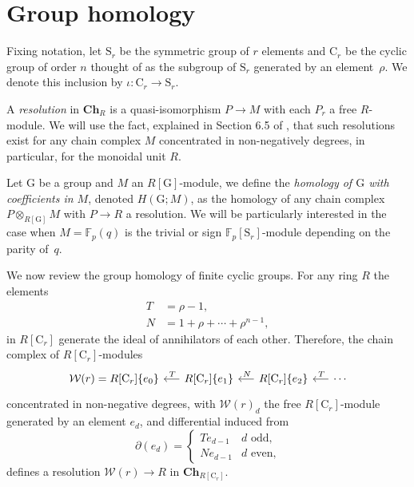 
\section{Group homology} \label{s:goup homology}

Fixing notation, let $\mathrm{S}_r$ be the symmetric group of $r$ elements and $\mathrm{C}_r$ be the cyclic group of order $n$ thought of as the subgroup of $\mathrm{S}_r$ generated by an element~$\rho$.
We denote this inclusion by $\iota \colon \mathrm C_r \to \mathrm S_r$.

A \textit{resolution} in $\mathbf{Ch}_R$ is a quasi-isomorphism $P \to M$ with each $P_r$ a free \mbox{$R$-module}.
We will use the fact, explained in Section 6.5 of \cite{jacobson1989algebra}, that such resolutions exist for any chain complex $M$ concentrated in non-negatively degrees, in particular, for the monoidal unit $R$.

Let $\mathrm G$ be a group and $M$ an $R[\mathrm G]$-module, we define the \textit{homology of $\mathrm G$ with coefficients in $M$}, denoted $H(\mathrm G; M)$, as the homology of any chain complex $P \otimes_{R[\mathrm G]} M$ with $P \to R$ a resolution.
We will be particularly interested in the case when $M = \mathbb F_p(q)$ is the trivial or sign $\mathbb F_p[\mathrm{S}_r]$-module depending on the parity of~$q$.

We now review the group homology of finite cyclic groups.
For any ring $R$ the elements
\begin{equation} \label{eq: T and R definition}
\begin{split}
T &= \rho - 1, \\
N &= 1 + \rho + \cdots + \rho^{n-1},
\end{split}
\end{equation}
in $R[\mathrm{C}_r]$ generate the ideal of annihilators of each other.
Therefore, the chain complex of $R[\mathrm{C}_r]$-modules
\begin{equation} \label{eq: minimal resolution}
\begin{tikzcd} [column sep = .5cm]
\mathcal W(r) = R[\mathrm{C}_r]\{e_0\} & \arrow[l, "\,T"'] R[\mathrm{C}_r]\{e_1\} & \arrow[l, "\,N"'] R[\mathrm{C}_r]\{e_2\} & \arrow[l, "\,T"'] \cdots
\end{tikzcd}
\end{equation}
concentrated in non-negative degrees, with $\mathcal W(r)_d$ the free $R[\mathrm{C}_r]$-module generated by an element $e_d$, and differential induced from
\begin{equation*}
\partial(e_d) = \begin{cases}
Te_{d-1} & d \text{ odd,} \\
Ne_{d-1} & d \text{ even,}
\end{cases}
\end{equation*}
defines a resolution $\mathcal W(r) \to R$ in $\mathbf{Ch}_{R[\mathrm{C}_r]}$.

